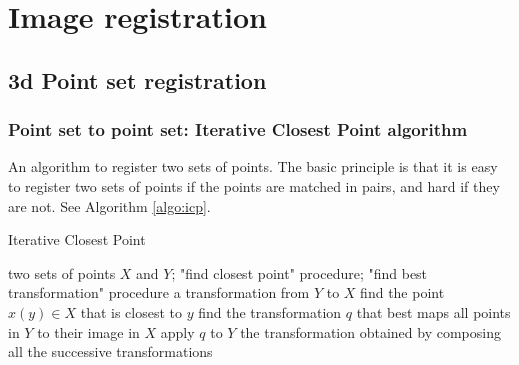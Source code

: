 \documentclass[11pt]{article} %
\begin{document}



\newpage

\section{Image registration}
  \subsection{ 3d Point set registration}
    \subsubsection{ Point set to point set: Iterative Closest Point algorithm \linebreak[4] \cite{besl:icp, chen:icp}}
An algorithm to register two sets of points. The basic principle is that it is easy to register two sets of points if the points are matched in pairs, and hard if they are not. See Algorithm \ref{algo:icp}.

\begin{algorithm}[h!]
\caption{Iterative Closest Point}
\label{algo:icp}
\begin{algorithmic}
  \REQUIRE two sets of points $X$ and $Y$; "find closest point" procedure; "find best transformation" procedure
  \ENSURE a transformation from $Y$ to $X$
  \REPEAT
      \STATE find the point $x(y) \in X$ that is closest to $y$
    \ENDFOR
    \STATE find the transformation $q$ that best maps all points in $Y$ to their image in $X$
    \STATE apply $q$ to $Y$
  \RETURN the transformation obtained by composing all the successive transformations
\end{algorithmic}
\end{algorithm}
\end{document}
